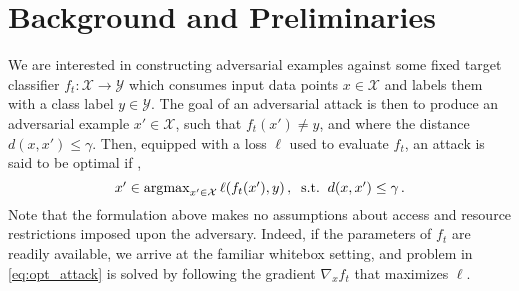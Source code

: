 \section{Background and Preliminaries}

We are interested in constructing adversarial examples against some fixed 
target classifier $f_{t}: \mathcal{X} \to \mathcal{Y}$ which consumes input data points $x \in \mathcal{X}$ and labels them with a class label $y \in \mathcal{Y}$. The goal of an adversarial attack is then to produce an adversarial example $x' \in \mathcal{X}$, such that $f_t(x') \neq y$, and where the distance $d(x,x') \leq \gamma$. Then, equipped with a loss $\ell$ used to evaluate $f_{t}$, an attack is said to be optimal if \citep{carlini2017magnet, madry2017towards}, 
\begin{equation}\label{eq:opt_attack}
    \textstyle x' \in \operatorname*{\arg\!\max}_{x'\in {\mathcal{X}}}\ell(f_{t}(x'),y) \,, \;\; \text{s.t.} \;\; d(x,x') \leq \gamma \,.
\end{equation}
Note that the formulation above makes no assumptions about access and resource restrictions imposed upon the adversary. Indeed, if the parameters of $f_t$ are readily available, we arrive at the familiar whitebox setting, and problem in \eqref{eq:opt_attack} is solved by following the gradient $\nabla_x f_{t}$ that maximizes $\ell$. 

